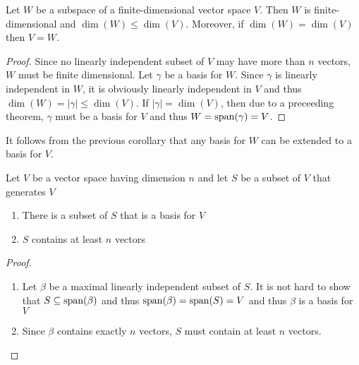 \begin{theorem}
    Let $W$ be a subspace of a finite-dimensional vector space $V$. Then $W$ is finite-dimensional and $\dim(W)\le\dim(V)$. Moreover, if $\dim(W) = \dim(V)$ then $V = W$.
\end{theorem}
\begin{proof}
    Since no linearly independent subset of $V$ may have more than $n$ vectors, $W$ must be finite dimensional. Let $\gamma$ be a basis for $W$. Since $\gamma$ is linearly independent in $W$, it is obviously linearly independent in $V$ and thus $\dim(W) = |\gamma|\le\dim(V)$. If $|\gamma| = \dim(V)$, then due to a preceeding theorem, $\gamma$ must be a basis for $V$ and thus $W = \operatorname{span}(\gamma) = V$.
\end{proof}

It follows from the previous corollary that any basis for $W$ can be extended to a basis for $V$.

\begin{lemma}
    Let $V$ be a vector space having dimension $n$ and let $S$ be a subset of $V$ that generates $V$
    \begin{enumerate}
        \item There is a subset of $S$ that is a basis for $V$ 
        \item $S$ contains at least $n$ vectors
    \end{enumerate}
\end{lemma}
\begin{proof}
    \hfill 
    \begin{enumerate}
        \item Let $\beta$ be a maximal linearly independent subset of $S$. It is not hard to show that $S\subseteq\operatorname{span}(\beta)$ and thus $\operatorname{span}(\beta) = \operatorname{span}(S) = V$ and thus $\beta$ is a basis for $V$ 
        \item Since $\beta$ contains exactly $n$ vectors, $S$ must contain at least $n$ vectors.
    \end{enumerate}
\end{proof}

